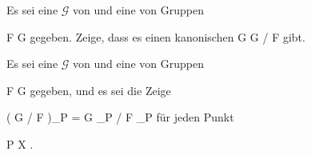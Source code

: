 {}
{





Es sei eine
${ \mathcal  G   }$ von
und eine
von Gruppen

\mavergleichskette
{\vergleichskette
{ { \mathcal  F   }
}
{ \subseteq }{ { \mathcal  G   }
}
{  }{
}
{    }{
}
{   }{
}
}
{}{}{}
gegeben. Zeige, dass es einen kanonischen
\maabbdisp {} { { \mathcal  G   } } { { \mathcal  G   } / { \mathcal  F   }
} {}
gibt.





}
{} {}

{}
{





Es sei eine
${ \mathcal  G   }$ von
und eine
von Gruppen

\mavergleichskette
{\vergleichskette
{ { \mathcal  F   }
}
{ \subseteq }{ { \mathcal  G   }
}
{  }{
}
{    }{
}
{   }{
}
}
{}{}{}
gegeben, und es sei
 die
Zeige

\mavergleichskettedisp
{\vergleichskette
{ \left(  { \mathcal  G   } / { \mathcal  F   }   \right)_P
}
{ =} { { \mathcal  G   }_P / { \mathcal  F   }_P
}
{ } {
}
{ } {
}
{ } {
}
}
{}{}{}
für jeden Punkt

\mavergleichskette
{\vergleichskette
{P
}
{ \in }{ X
}
{  }{
}
{    }{
}
{   }{
}
}
{}{}{.}





}
{} {}
